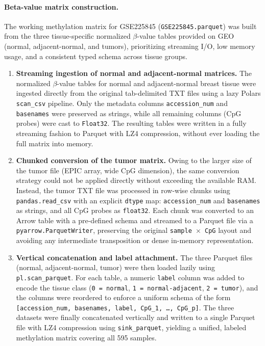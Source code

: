 \documentclass[10pt]{extarticle}
\begin{document}
\paragraph{Beta-value matrix construction.}
The working methylation matrix for GSE225845 (\texttt{GSE225845.parquet}) was built from the three tissue-specific normalized $\beta$-value tables provided on GEO (normal, adjacent-normal, and tumors), prioritizing streaming I/O, low memory usage, and a consistent typed schema across tissue groups.
\begin{enumerate}[label=\arabic*)]
  \item \textbf{Streaming ingestion of normal and adjacent-normal matrices.}  
  The normalized $\beta$-value tables for normal and adjacent-normal breast tissue were ingested directly from the original tab-delimited TXT files using a lazy Polars \texttt{scan\_csv} pipeline.  
  Only the metadata columns \texttt{accession\_num} and \texttt{basenames} were preserved as strings, while all remaining columns (CpG probes) were cast to \texttt{Float32}.  
  The resulting tables were written in a fully streaming fashion to Parquet with LZ4 compression, without ever loading the full matrix into memory.

  \item \textbf{Chunked conversion of the tumor matrix.}  
  Owing to the larger size of the tumor file (EPIC array, wide CpG dimension), the same conversion strategy could not be applied directly without exceeding the available RAM.  
  Instead, the tumor TXT file was processed in row-wise chunks using \texttt{pandas.read\_csv} with an explicit \texttt{dtype} map: \texttt{accession\_num} and \texttt{basenames} as strings, and all CpG probes as \texttt{float32}.  
  Each chunk was converted to an Arrow table with a pre-defined schema and streamed to a Parquet file via a \texttt{pyarrow.ParquetWriter}, preserving the original \texttt{sample~$\times$~CpG} layout and avoiding any intermediate transposition or dense in-memory representation.

  \item \textbf{Vertical concatenation and label attachment.}  
  The three Parquet files (normal, adjacent-normal, tumor) were then loaded lazily using \texttt{pl.scan\_parquet}.  
  For each table, a numeric \texttt{label} column was added to encode the tissue class (\texttt{0 = normal}, \texttt{1 = normal-adjacent}, \texttt{2 = tumor}), and the columns were reordered to enforce a uniform schema of the form  
  \texttt{[accession\_num, basenames, label, CpG\_1, \dots, CpG\_p]}.  
  The three datasets were finally concatenated vertically and written to a single Parquet file with LZ4 compression using \texttt{sink\_parquet}, yielding a unified, labeled methylation matrix covering all 595 samples.
\end{enumerate}
\end{document}
